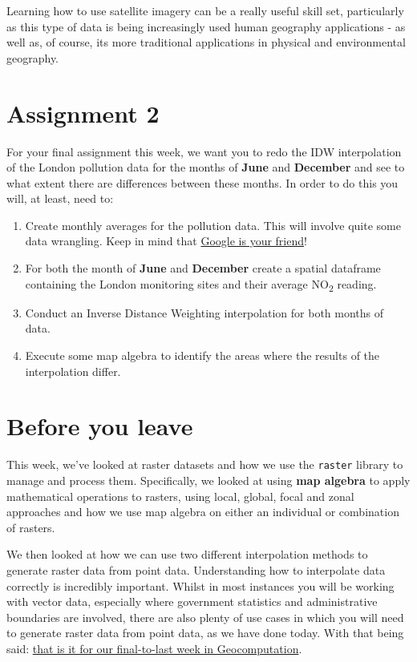 \documentclass[
]{book}
\providecommand{\tightlist}{%
  \setlength{\itemsep}{0pt}\setlength{\parskip}{0pt}}
\begin{document}
Learning how to use satellite imagery can be a really useful skill set, particularly as this type of data is being increasingly used human geography applications - as well as, of course, its more traditional applications in physical and environmental geography.

\hypertarget{assignment-w09-02}{%
\section{Assignment 2}\label{assignment-w09-02}}

For your final assignment this week, we want you to redo the IDW interpolation of the London pollution data for the months of \textbf{June} and \textbf{December} and see to what extent there are differences between these months. In order to do this you will, at least, need to:

\begin{enumerate}
\def\labelenumi{\arabic{enumi}.}
\tightlist
\item
  Create monthly averages for the pollution data. This will involve quite some data wrangling. Keep in mind that \href{https://lmgtfy.app/?q=google+is+your+friend}{Google is your friend}!
\item
  For both the month of \textbf{June} and \textbf{December} create a spatial dataframe containing the London monitoring sites and their average NO\textsubscript{2} reading.
\item
  Conduct an Inverse Distance Weighting interpolation for both months of data.
\item
  Execute some map algebra to identify the areas where the results of the interpolation differ.
\end{enumerate}

\hypertarget{byl-w09}{%
\section{Before you leave}\label{byl-w09}}

This week, we've looked at raster datasets and how we use the \texttt{raster} library to manage and process them. Specifically, we looked at using \textbf{map algebra} to apply mathematical operations to rasters, using local, global, focal and zonal approaches and how we use map algebra on either an individual or combination of rasters.

We then looked at how we can use two different interpolation methods to generate raster data from point data. Understanding how to interpolate data correctly is incredibly important. Whilst in most instances you will be working with vector data, especially where government statistics and administrative boundaries are involved, there are also plenty of use cases in which you will need to generate raster data from point data, as we have done today. With that being said: \href{https://www.youtube.com/watch?v=8iwBM_YB1sE}{that is it for our final-to-last week in Geocomputation}.
\end{document}
